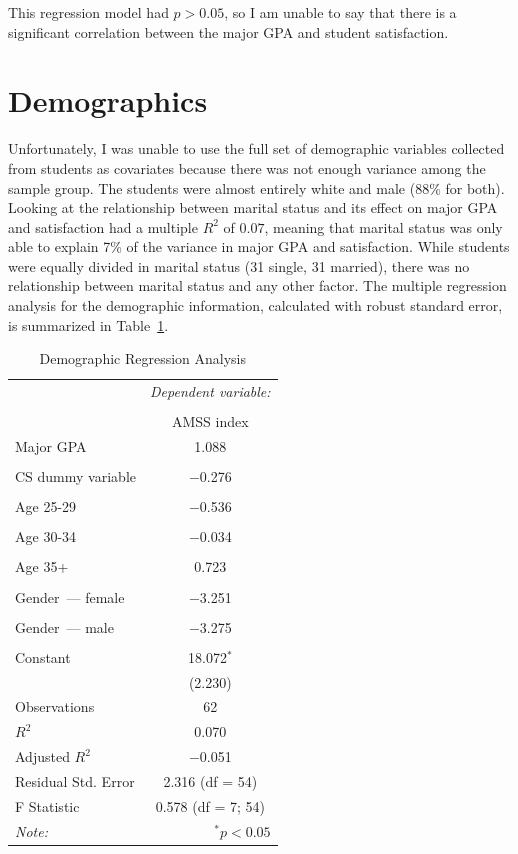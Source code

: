 This regression model had $p>0.05$, so I am unable to say that there is a significant correlation between the major GPA and student satisfaction.

\section{Demographics}
Unfortunately, I was unable to use the full set of demographic variables collected from students as covariates because there was not enough variance among the sample group. The students were almost entirely white and male (88\% for both). Looking at the relationship between marital status and its effect on major GPA and satisfaction had a multiple $R^2$ of $0.07$, meaning that marital status was only able to explain 7\% of the variance in major GPA and satisfaction. While students were equally divided in marital status (31 single, 31 married), there was no relationship between marital status and any other factor. The multiple regression analysis for the demographic information, calculated with robust standard error, is summarized in Table~\ref{tab:demographics}.

\begin{table}[!htbp] \centering
  \caption{Demographic Regression Analysis}
  \label{tab:demographics}
  \begin{tabular}{@{\extracolsep{5pt}}lc}
    \toprule
     & \multicolumn{1}{c}{\textit{Dependent variable:}} \\
    \cline{2-2}
    \\[-1.8ex] & AMSS index \\
    \midrule
    Major GPA & 1.088 \\
    &  \\
    CS dummy variable & $-$0.276 \\
    &  \\
    Age 25-29 & $-$0.536 \\
    &  \\
    Age 30-34 & $-$0.034 \\
    &  \\
    Age 35+ & 0.723 \\
    &  \\
    Gender~--- female & $-$3.251 \\
    &  \\
    Gender~--- male & $-$3.275 \\
    &  \\
    Constant & 18.072$^{*}$ \\
    & (2.230) \\
    \midrule
    Observations & 62 \\
    $R^{2}$ & 0.070 \\
    Adjusted $R^{2}$ & $-$0.051 \\
    Residual Std. Error & 2.316 (df = 54) \\
    F Statistic & 0.578 (df = 7; 54) \\
    \bottomrule
    \textit{Note:}  & \multicolumn{1}{r}{$^{*}p<0.05$} \\
  \end{tabular}
\end{table}
